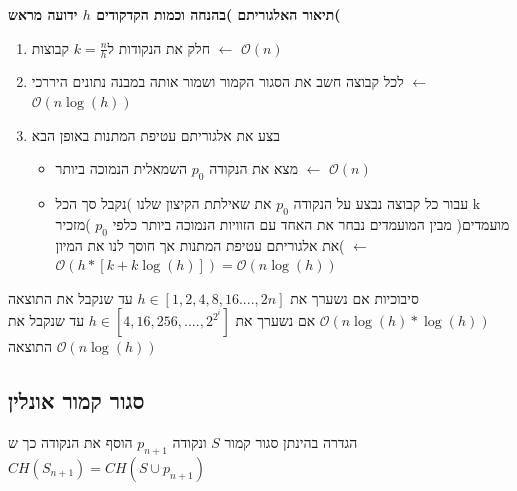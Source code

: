 \documentclass{article}
\makeatletter
\newcommand*{\saved@uline}{}
\let\saved@uline\uline
\newcommand*{\mathuline}{%
  \mathpalette{\math@uline\saved@uline}%
}
\newcommand*{\math@uline}[3]{%
  \mbox{#1{$#2#3\m@th$}}%
}
\renewcommand*{\uline}{%
  \relax  
  \ifmmode
    \expandafter\mathuline
  \else
    \expandafter\saved@uline
  \fi
}
\makeatother
\begin{document}
\noindent\textbf{תיאור האלגוריתם )בהנחה וכמות הקדקודים $h$ ידועה מראש( }
\begin{enumerate}
\item חלק את הנקודות ל$k=\frac{n}{h}$ קבוצות $\leftarrow$ $\mathcal{O}(n)$
\item לכל קבוצה חשב את הסגור הקמור ושמור אותה במבנה נתונים היררכי $\leftarrow$ $\mathcal{O}(n\log(h))$
\item בצע את אלגוריתם עטיפת המתנות באופן הבא
\begin{itemize}
\item מצא את הנקודה $p_0$ השמאלית הנמוכה ביותר $\leftarrow$ $\mathcal{O}(n)$
\item עבור כל קבוצה נבצע על הנקודה $p_0$ את שאילתת הקיצון שלנו )נקבל סך הכל k מועמדים( מבין המועמדים נבחר את האחד עם הזוויות הנמוכה ביותר כלפי $p_0$ )מזכיר את אלגוריתם עטיפת המתנות אך חוסך לנו את המיון( $\leftarrow$ $\mathcal{O}(h*[k+k\log(h)])=\mathcal{O}(n\log(h))$
\end{itemize}
\end{enumerate}

\noindent\uline{סיבוכיות}  אם נשערך את $h \in [1,2,4,8,16....,2n]$ עד שנקבל את התוצאה $\mathcal{O}(n\log(h)* \log(h))$ אם נשערך את $h \in [4,16,256,....,2^{2^i}]$ עד שנקבל את התוצאה $\mathcal{O}(n\log(h))$ 

\subsection{סגור קמור אונלין}
\noindent\uline{הגדרה} בהינתן סגור קמור $S$ ונקודה $p_{n+1}$ הוסף את הנקודה כך ש$CH(S_{n+1})=CH(S \cup p_{n+1})$ 
\end{document}
